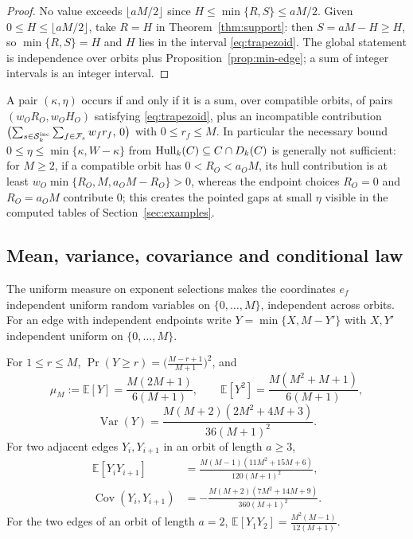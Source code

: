\begin{proof}
No value exceeds $\lfloor aM/2\rfloor$ since
$H\leq\min\{R,S\}\leq aM/2$.  Given $0\leq H\leq\lfloor aM/2\rfloor$, take
$R=H$ in Theorem~\ref{thm:support}: then $S=aM-H\geq H$, so
$\min\{R,S\}=H$ and $H$ lies in the interval \eqref{eq:trapezoid}.  The global
statement is independence over orbits plus Proposition~\ref{prop:min-edge};
a sum of integer intervals is an integer interval.
\end{proof}

\begin{corollary}\label{cor:global-support}
A pair $(\kappa,\eta)$ occurs if and only if it is a sum, over compatible
orbits, of pairs $(w_OR_O,w_OH_O)$ satisfying \eqref{eq:trapezoid}, plus an
incompatible contribution $\bigl(\sum_{s\in\mathcal{S}_k^{\mathrm{inc}}}
\sum_{f\in\mathcal F_s}w_fr_f,\,0\bigr)$ with $0\leq r_f\leq M$.  In particular the
necessary bound $0\leq\eta\leq\min\{\kappa,W-\kappa\}$ from
$\operatorname{Hull}_k(C)\subseteq C\cap D_k(C)$ is generally not sufficient: for $M\geq2$,
if a compatible orbit has $0<R_O<a_OM$, its hull contribution is at least
$w_O\min\{R_O,M,a_OM-R_O\}>0$, whereas the endpoint choices $R_O=0$ and
$R_O=a_OM$ contribute $0$; this creates the
pointed gaps at small $\eta$ visible in the computed tables of
Section~\ref{sec:examples}.
\end{corollary}

\subsection{Mean, variance, covariance and conditional law}
\label{sec:moments}

The uniform measure on exponent selections makes the coordinates $e_f$
independent uniform random variables on $\{0,\ldots,M\}$, independent across
orbits.  For an edge with independent endpoints write
$Y=\min\{X,M-Y'\}$ with $X,Y'$ independent uniform on $\{0,\ldots,M\}$.

\begin{lemma}\label{lem:edge-moments}
For $1\leq r\leq M$,
$\Pr(Y\geq r)=\bigl(\frac{M-r+1}{M+1}\bigr)^2$, and
{\small
\[
\mu_M:=\mathbb{E}[Y]=\frac{M(2M+1)}{6(M+1)},\qquad
\mathbb{E}[Y^2]=\frac{M(M^2+M+1)}{6(M+1)},
\]
}
\[
\operatorname{Var}(Y)
 =\frac{M(M+2)(2M^2+4M+3)}{36(M+1)^2}.
\]
For two adjacent edges $Y_i,Y_{i+1}$ in an orbit of length $a\geq3$,
\begin{align*}
\mathbb{E}[Y_iY_{i+1}]
 &=\frac{M(M-1)(11M^2+15M+6)}{120(M+1)^2},\\
\operatorname{Cov}(Y_i,Y_{i+1})
 &=-\frac{M(M+2)(7M^2+14M+9)}{360(M+1)^2}.
\end{align*}
For the two edges of an orbit of length $a=2$,
$\mathbb{E}[Y_1Y_2]=\frac{M^2(M-1)}{12(M+1)}$.
\end{lemma}

